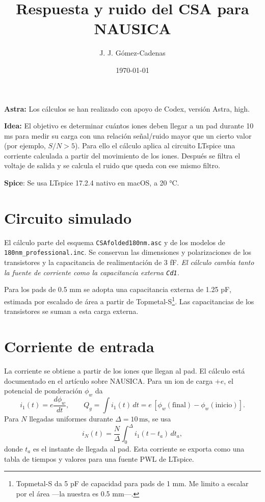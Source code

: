 \documentclass[11pt,a4paper]{article}
\title{Respuesta y ruido del CSA para NAUSICA}
\author{J. J. G\'omez-Cadenas}
\date{\today}
\begin{document}
\maketitle

{\bf Astra:} Los cálculos se han realizado con apoyo de Codex, versión Astra, high.

{\bf Idea:} El objetivo es determinar cuántos iones deben llegar a un pad durante
10 ms para medir su carga con una relación señal/ruido mayor que un cierto valor (por ejemplo, $S/N>5$).
Para ello el cálculo aplica al circuito LTspice una corriente calculada a partir del movimiento
de los iones. Después se filtra el voltaje de salida y se calcula el ruido
que queda con ese mismo filtro.

{\bf Spice}: Se usa LTspice 17.2.4 nativo en macOS, a 20 °C.


\section{Circuito simulado}

El cálculo parte del esquema \texttt{CSAfolded180nm.asc} y de los modelos de
\texttt{180nm\_professional.inc}. Se conservan las dimensiones y polarizaciones
de los transistores y la capacitancia de realimentación de 3 fF. \emph{El cálculo cambia tanto la fuente de corriente como
la capacitancia externa \texttt{Cd1}.}

Para los pads de 0.5 mm se adopta una capacitancia externa de 1.25 pF,
estimada por escalado de área a partir de Topmetal-S\footnote{Topmetal-S da 5 pF de capacidad para pads de 1 mm. Me limito a escalar por el área ---la nuestra es 0.5 mm---. }. Las capacitancias de
los transistores se suman a esta carga externa.

\section{Corriente de entrada}

La corriente se obtiene a partir de los iones que llegan al pad. El cálculo
está documentado en el artículo sobre NAUSICA. Para un ion de carga
$+e$, el potencial de ponderación $\phi_w$ da
\[
 i_1(t)=e\frac{d\phi_w}{dt},\qquad
 Q_g=\int i_1(t)\,dt
 =e\,[\phi_w(\mathrm{final})-\phi_w(\mathrm{inicio})].
\]
Para $N$ llegadas uniformes durante $\Delta=10\,\mathrm{ms}$, se usa
\[
 i_N(t)=\frac{N}{\Delta}\int_0^\Delta i_1(t-t_a)\,dt_a,
\]
donde $t_a$ es el instante de llegada al pad. Esta corriente se exporta
como una tabla de tiempos y valores para una fuente PWL de LTspice.
\end{document}
